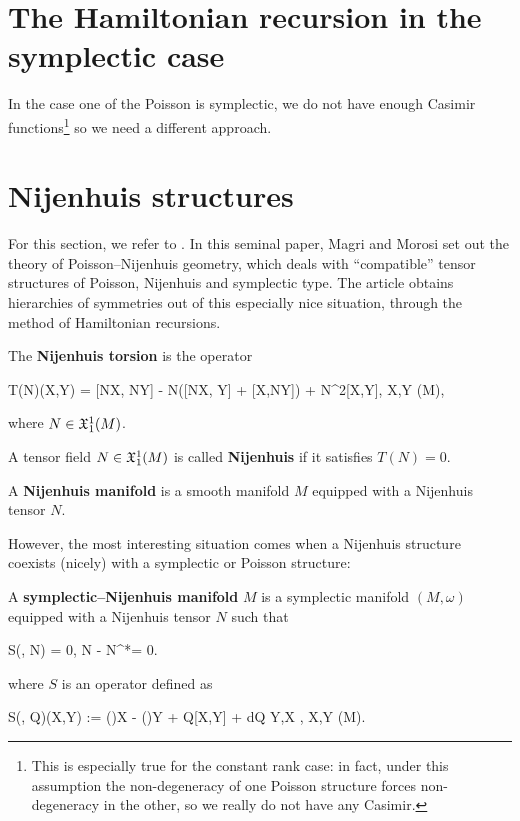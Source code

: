 \documentclass[main.tex]{subfiles}
\begin{document}
\section{The Hamiltonian recursion in the symplectic case}
In the case one of the Poisson is symplectic, we do not have enough Casimir functions\footnote{This is especially true for the constant rank case: in fact, under this assumption the non-degeneracy of one Poisson structure forces non-degeneracy in the other, so we really do not have any Casimir.} so we need a different approach.

\section{Nijenhuis structures}
For this section, we refer to \cite{magri1984geometrical}. In this seminal paper, Magri and Morosi set out the theory of Poisson--Nijenhuis geometry, which deals with ``compatible'' tensor structures of Poisson, Nijenhuis and symplectic type. The article obtains hierarchies of symmetries out of this especially nice situation, through the method of Hamiltonian recursions.

\begin{definition}
	The \textbf{Nijenhuis torsion} is the operator
	\begin{eqalign}
		T(N)(X,Y) = [NX, NY] - N([NX, Y] + [X,NY]) + N^2[X,Y], \quad \forall X,Y \in \fields(M),
	\end{eqalign}
	where $N \in \mathfrak{X}^1_1(M)$.
\end{definition}

\begin{definition}
	A tensor field $N \in \mathfrak{X}^1_1(M)$ is called \textbf{Nijenhuis} if it satisfies $T(N) = 0$.
\end{definition}

\begin{definition}
	A \textbf{Nijenhuis manifold} is a smooth manifold $M$ equipped with a Nijenhuis tensor $N$.
\end{definition}

However, the most interesting situation comes when a Nijenhuis structure coexists (nicely) with a symplectic or Poisson structure:

\begin{definition}
	A \textbf{symplectic--Nijenhuis manifold} $M$ is a symplectic manifold $(M, \omega)$ equipped with a Nijenhuis tensor $N$ such that
	\begin{eqalign}
	\label{eq:symp_nijenhuis_conditions}
		S(\omega, N) = 0, \quad \omega N - N^*\omega = 0.
	\end{eqalign}
	where $S$ is an operator defined as
	\begin{eqalign}
		S(\eta, Q)(X,Y) := (\eta)X - (\eta)Y + \eta Q[X,Y] + d\langle \eta Q Y,X \rangle, \quad X,Y \in \fields(M).
	\end{eqalign}
\end{definition}
\end{document}
